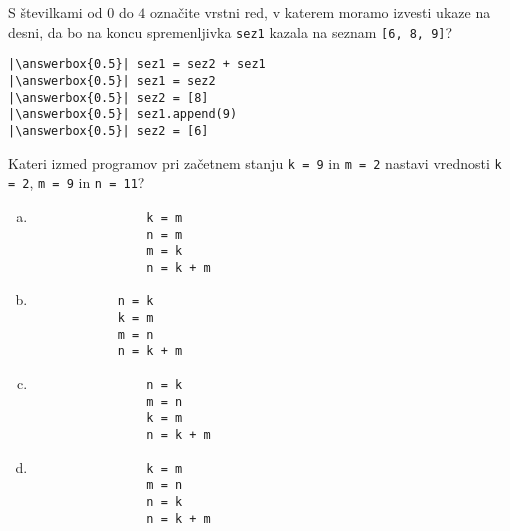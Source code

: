 \documentclass[arhiv, 10pt]{../izpit}
\newcommand{\inlinepy}[1]{\texttt{#1}}
\newcommand{\answerbox}[1]{\framebox{\vphantom{\large M}\hspace{#1cm}}}
\begin{document}
        \naloga*
        \begin{multicols}{2}
        \noindent 
        S številkami od $0$ do $4$ označite vrstni red, v katerem moramo izvesti ukaze na desni, da bo na koncu spremenljivka \inlinepy{sez1} kazala na seznam \inlinepy{[6, 8, 9]}?
    
        \columnbreak
        \noindent
        \begin{verbatim}
|\answerbox{0.5}| sez1 = sez2 + sez1
|\answerbox{0.5}| sez1 = sez2
|\answerbox{0.5}| sez2 = [8]
|\answerbox{0.5}| sez1.append(9)
|\answerbox{0.5}| sez2 = [6]

        \end{verbatim}
        \end{multicols}
    
            
        \naloga*
        
        Kateri izmed programov pri začetnem stanju
            \inlinepy{k = 9} in
            \inlinepy{m = 2}
        nastavi vrednosti
            \inlinepy{k = 2},
            \inlinepy{m = 9} in
            \inlinepy{n = 11}?
    
        \begin{multicols}{4}
        \begin{enumerate}[(a)]
\item 
                \begin{verbatim}
                k = m
                n = m
                m = k
                n = k + m
                \end{verbatim}
            
\item 
            \begin{verbatim}
            n = k
            k = m
            m = n
            n = k + m
            \end{verbatim}
        
\item 
                \begin{verbatim}
                n = k
                m = n
                k = m
                n = k + m
                \end{verbatim}
            
\item 
                \begin{verbatim}
                k = m
                m = n
                n = k
                n = k + m
                \end{verbatim}
            
\end{enumerate}

        \end{multicols}
    
\end{document}
